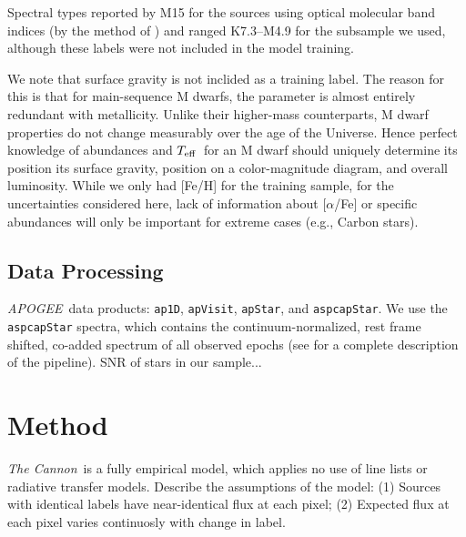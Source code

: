 \documentclass[modern]{aastex62}
\newcommand{\apogee}{\textsl{APOGEE}}
\newcommand{\thecannon}{\textsl{The Cannon}}
\newcommand{\teff}{$T_{\rm eff}$}
\begin{document}
Spectral types reported by M15 for the sources using optical molecular band indices (by the method of \citealt{Lepine:2013}) and ranged K7.3--M4.9 for the subsample we used, although these labels were not included in the model training.

We note that surface gravity is not inclided as a training label. The reason for this is that for main-sequence M dwarfs, the parameter is almost entirely redundant with metallicity. Unlike their higher-mass counterparts, M dwarf properties do not change measurably over the age of the Universe. Hence perfect knowledge of abundances and \teff\ for an M dwarf should uniquely determine its position its surface gravity, position on a color-magnitude diagram, and overall luminosity. While we only had [Fe/H] for the training sample, for the uncertainties considered here, lack of information about [$\alpha$/Fe] or specific abundances will only be important for extreme cases (e.g., Carbon stars). 



\subsection{Data Processing}

\apogee\ data products: {\tt\string ap1D}, {\tt\string apVisit}, {\tt\string apStar}, and {\tt\string aspcapStar}. We use the {\tt\string aspcapStar} spectra, which contains the continuum-normalized, rest frame shifted, co-added spectrum of all observed epochs (see \citealt{Perez:2016} for a complete description of the pipeline). SNR of stars in our sample...


\section{Method}\label{sec:cannon}

\thecannon\ is a fully empirical model, which applies no use of line lists or radiative transfer models. Describe the assumptions of the model: (1) Sources with identical labels have near-identical flux at each pixel; (2) Expected flux at each pixel varies continuosly with change in label. 
\end{document}
